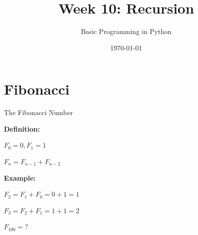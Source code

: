 



\title[Recursion]{Week 10: Recursion}
\subtitle{Basic Programming in Python}

\date{\today}

\begin{frame}[plain]
     \titlepage
\end{frame}

\begin{frame}
    \tableofcontents
\end{frame}

\section{Fibonacci}

\begin{frame}
    \sectionpage
\end{frame}


\begin{frame}{The Fibonacci Number}

\textbf{Definition:}


$F_0 = 0, F_1 = 1$

$F_n = F_{n-1} + F_{n-2}$

\vspace{1em}
\textbf{Example:}


$F_2 = F_1 + F_0 = 0 + 1 = 1$

$F_3 = F_2 + F_1 = 1 + 1 = 2$

$F_{100} = ?$

\end{frame}


